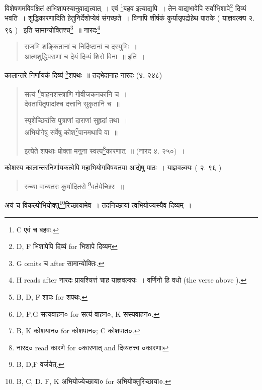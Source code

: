 \documentclass[11pt, openany]{book}
\begin{document}
\newpage
{}

\noindent
विशेषणमविवक्षितं अभिशापस्यानुवाद्यत्वात्~। एवं \renewcommand{\thefootnote}{1}\footnote{C एवं च बहवः.}बहव इत्याद्यपि~। तेन वाद्यभावेपि सर्वाभिशापे\renewcommand{\thefootnote}{2}\footnote{D, F भिशापेपि दिव्यं for भिशापे दिव्यम्} दिव्यं भवति~। शुद्धिकारणादिति हेतुनिर्देशोप्येवं संगच्छते~। विनापि शीर्षकं कुर्यान्नृपद्रोहेथ पातके ( याज्ञवल्क्य २. ९६ ) \textendash\ इति सामान्योक्तिश्च\renewcommand{\thefootnote}{3}\footnote{G omits च after सामान्योक्तिः.}~॥ नारदः\renewcommand{\thefootnote}{4}\footnote{H reads after नारदः प्रायश्चित्तं चाह याज्ञवल्क्यः~। वर्णिनो हि वधो (the verse above ).}

\begin{quote}
{\vy राजभि शङ्कितानां च निर्दिष्टानां च दस्युभिः~।\\
आत्मशुद्धिपराणां च देयं दिव्यं शिरो विना~॥} इति~।
\end{quote}

कालान्तरे निर्णायकं दिव्यं \renewcommand{\thefootnote}{5}\footnote{B, D, F शापः for शपथः.}शपथः~॥ तद्भेदानाह नारदः (४. २४८)

\begin{quote}
{\vy सत्यं \renewcommand{\thefootnote}{6}\footnote{D, F,G सत्यवाहन० for सत्यं वाहन०, K सस्यवाहन०.}वाहनशस्त्राणि गोवीजकनकानि च~।\\
देवतापितृपादांश्च दत्तानि सुकृतानि च~॥

स्पृशेच्छिरांसि पुत्राणां दाराणां सुहृदां तथा~।\\
अभियोगेषु सर्वेषु कोश\renewcommand{\thefootnote}{7}\footnote{B, K कोशयान० for कोशपान०; C कोशपात०.}पानमथापि वा~॥}

इत्येते शपथाः प्रोक्ता मनुना स्वल्प\renewcommand{\thefootnote}{8}\footnote{नारद० read कारणे for ०कारणात् and दिव्यतत्त्व {\qt ०कारणाः}}कारणात्~॥ (नारद ४. २५०)~।
\end{quote}

कोशस्य कालान्तरनिर्णायकत्वेपि महाभियोगविषयतया आद्येषु पाठः~। याज्ञवल्क्यः ( २. ९६ ) 

\begin{quote}
{\vy रुच्या वान्यतरः कुर्यादितरो \renewcommand{\thefootnote}{9}\footnote{B, D,F वर्जयेत्.}वर्तयेच्छिरः~॥}
\end{quote}

\newpage
{}

\noindent
अयं च विकल्पोभियोक्तु\renewcommand{\thefootnote}{1}\footnote{B, C, D. F, K अभियोज्येच्छाया० for अभियोक्तुरिच्छाया०.}रिच्छायामेव~। तदनिच्छायां त्वभियोज्यस्यैव दिव्यम्~।
\end{document}
